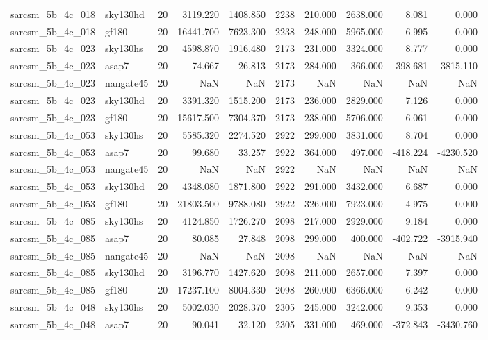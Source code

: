 \documentclass{article}
\begin{document}
\begin{longtable}{llrrrrrrrr}
sarcsm\_5b\_4c\_018 & sky130hd & 20 & 3119.220 & 1408.850 & 2238 & 210.000 & 2638.000 & 8.081 & 0.000 \\
sarcsm\_5b\_4c\_018 & gf180 & 20 & 16441.700 & 7623.300 & 2238 & 248.000 & 5965.000 & 6.995 & 0.000 \\
sarcsm\_5b\_4c\_023 & sky130hs & 20 & 4598.870 & 1916.480 & 2173 & 231.000 & 3324.000 & 8.777 & 0.000 \\
sarcsm\_5b\_4c\_023 & asap7 & 20 & 74.667 & 26.813 & 2173 & 284.000 & 366.000 & -398.681 & -3815.110 \\
sarcsm\_5b\_4c\_023 & nangate45 & 20 & NaN & NaN & 2173 & NaN & NaN & NaN & NaN \\
sarcsm\_5b\_4c\_023 & sky130hd & 20 & 3391.320 & 1515.200 & 2173 & 236.000 & 2829.000 & 7.126 & 0.000 \\
sarcsm\_5b\_4c\_023 & gf180 & 20 & 15617.500 & 7304.370 & 2173 & 238.000 & 5706.000 & 6.061 & 0.000 \\
sarcsm\_5b\_4c\_053 & sky130hs & 20 & 5585.320 & 2274.520 & 2922 & 299.000 & 3831.000 & 8.704 & 0.000 \\
sarcsm\_5b\_4c\_053 & asap7 & 20 & 99.680 & 33.257 & 2922 & 364.000 & 497.000 & -418.224 & -4230.520 \\
sarcsm\_5b\_4c\_053 & nangate45 & 20 & NaN & NaN & 2922 & NaN & NaN & NaN & NaN \\
sarcsm\_5b\_4c\_053 & sky130hd & 20 & 4348.080 & 1871.800 & 2922 & 291.000 & 3432.000 & 6.687 & 0.000 \\
sarcsm\_5b\_4c\_053 & gf180 & 20 & 21803.500 & 9788.080 & 2922 & 326.000 & 7923.000 & 4.975 & 0.000 \\
sarcsm\_5b\_4c\_085 & sky130hs & 20 & 4124.850 & 1726.270 & 2098 & 217.000 & 2929.000 & 9.184 & 0.000 \\
sarcsm\_5b\_4c\_085 & asap7 & 20 & 80.085 & 27.848 & 2098 & 299.000 & 400.000 & -402.722 & -3915.940 \\
sarcsm\_5b\_4c\_085 & nangate45 & 20 & NaN & NaN & 2098 & NaN & NaN & NaN & NaN \\
sarcsm\_5b\_4c\_085 & sky130hd & 20 & 3196.770 & 1427.620 & 2098 & 211.000 & 2657.000 & 7.397 & 0.000 \\
sarcsm\_5b\_4c\_085 & gf180 & 20 & 17237.100 & 8004.330 & 2098 & 260.000 & 6366.000 & 6.242 & 0.000 \\
sarcsm\_5b\_4c\_048 & sky130hs & 20 & 5002.030 & 2028.370 & 2305 & 245.000 & 3242.000 & 9.353 & 0.000 \\
sarcsm\_5b\_4c\_048 & asap7 & 20 & 90.041 & 32.120 & 2305 & 331.000 & 469.000 & -372.843 & -3430.760 \\

\end{longtable}
\end{document}
